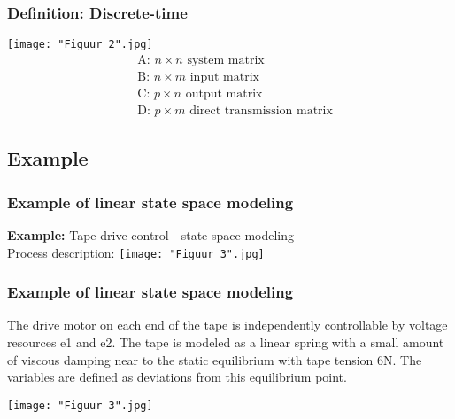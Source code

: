 \begin{frame}
	\frametitle{Definition: Discrete-time}
\vspace{0.5cm}
\texttt{[image: "Figuur 2".jpg]}
\begin{align*}
 &\text{A: } n\times n \text{ system matrix}\\
 &\text{B: } n\times m \text{ input matrix}\\
 &\text{C: } p\times n \text{ output matrix}\\
 &\text{D: } p\times m \text{ direct transmission matrix}
\end{align*}
\end{frame}

\subsection{Example}
\begin{frame}
	\frametitle{Example of linear state space modeling}
	\textbf{Example:} Tape drive control - state space modeling\\
	
Process description:
\vspace{0.5cm}
\texttt{[image: "Figuur 3".jpg]}
\end{frame}

\begin{frame}
	\frametitle{Example of linear state space modeling}
The drive motor on each end of the tape is independently
controllable by voltage resources e1 and e2. The tape is
modeled as a linear spring with a small amount of viscous
damping near to the static equilibrium with tape tension
6N. The variables are defined as deviations from this equilibrium
point.
\vspace{0cm}
\begin{center}
\texttt{[image: "Figuur 3".jpg]}
\end{center}
\end{frame}

